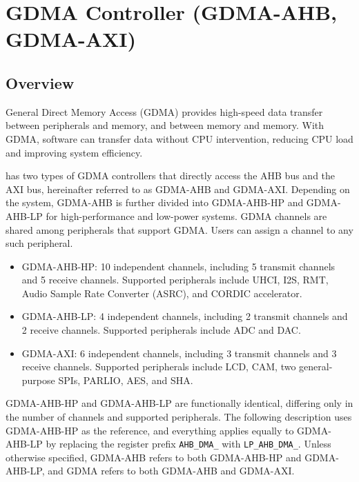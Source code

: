 \documentclass[main\_\_EN.tex]{subfiles}
\begin{document}
\setenglishformatting

\ifglobal
\else
    \clearpage
    \listoftodos
    \listofdonetodos
    \tableofcontents
\fi



\hypertarget{dma}{}
\chapter{GDMA Controller (GDMA-AHB, GDMA-AXI)}
\label{mod:dma}


\section{Overview}

General Direct Memory Access (GDMA) provides high-speed data transfer between peripherals and memory, and between memory and memory. With GDMA, software can transfer data without CPU intervention, reducing CPU load and improving system efficiency.

\chipname{} has two types of GDMA controllers that directly access the AHB bus and the AXI bus, hereinafter referred to as GDMA-AHB and GDMA-AXI. Depending on the system, GDMA-AHB is further divided into GDMA-AHB-HP and GDMA-AHB-LP for high-performance and low-power systems. GDMA channels are shared among peripherals that support GDMA. Users can assign a channel to any such peripheral.
\begin{itemize}
    \item GDMA-AHB-HP: 10 independent channels, including 5 transmit channels and 5 receive channels. Supported peripherals include UHCI, I2S, RMT, Audio Sample Rate Converter (ASRC), and CORDIC accelerator.
    \item GDMA-AHB-LP: 4 independent channels, including 2 transmit channels and 2 receive channels. Supported peripherals include ADC and DAC.
    \item GDMA-AXI: 6 independent channels, including 3 transmit channels and 3 receive channels. Supported peripherals include LCD, CAM, two general-purpose SPIs, PARLIO, AES, and SHA.
\end{itemize}

GDMA-AHB-HP and GDMA-AHB-LP are functionally identical, differing only in the number of channels and supported peripherals. The following description uses GDMA-AHB-HP as the reference, and everything applies equally to GDMA-AHB-LP by replacing the register prefix \texttt{AHB\_DMA\_} with \texttt{LP\_AHB\_DMA\_}. Unless otherwise specified, GDMA-AHB refers to both GDMA-AHB-HP and GDMA-AHB-LP, and GDMA refers to both GDMA-AHB and GDMA-AXI.
\end{document}
